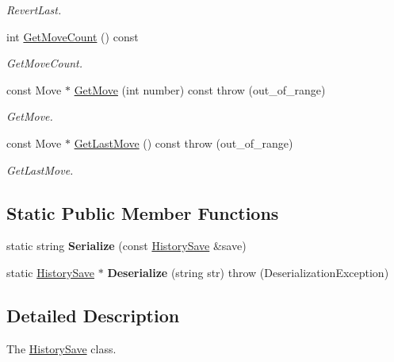 \begin{DoxyCompactItemize}
\begin{DoxyCompactList}\small\item\em Revert\-Last. \end{DoxyCompactList}\item 
int \hyperlink{classHistorySave_af1f736a6ee2b72f56ac6985e788013a9}{Get\-Move\-Count} () const 
\begin{DoxyCompactList}\small\item\em Get\-Move\-Count. \end{DoxyCompactList}\item 
const Move $\ast$ \hyperlink{classHistorySave_a57b50e201ba2df976727bb07c449f244}{Get\-Move} (int number) const   throw (out\-\_\-of\-\_\-range)
\begin{DoxyCompactList}\small\item\em Get\-Move. \end{DoxyCompactList}\item 
const Move $\ast$ \hyperlink{classHistorySave_a35b8a35a1673f21ea7f53558d4ec198a}{Get\-Last\-Move} () const   throw (out\-\_\-of\-\_\-range)
\begin{DoxyCompactList}\small\item\em Get\-Last\-Move. \end{DoxyCompactList}\end{DoxyCompactItemize}
\subsection*{Static Public Member Functions}
\begin{DoxyCompactItemize}
\item 
\hypertarget{classHistorySave_ace6232957dee248b44040d13ff3a2085}{static string {\bfseries Serialize} (const \hyperlink{classHistorySave}{History\-Save} \&save)}\label{classHistorySave_ace6232957dee248b44040d13ff3a2085}

\item 
\hypertarget{classHistorySave_a4c37e0e903a5cf911885ab6fb73c450c}{static \hyperlink{classHistorySave}{History\-Save} $\ast$ {\bfseries Deserialize} (string str)  throw (\-Deserialization\-Exception)}\label{classHistorySave_a4c37e0e903a5cf911885ab6fb73c450c}

\end{DoxyCompactItemize}


\subsection{Detailed Description}
The \hyperlink{classHistorySave}{History\-Save} class. 

